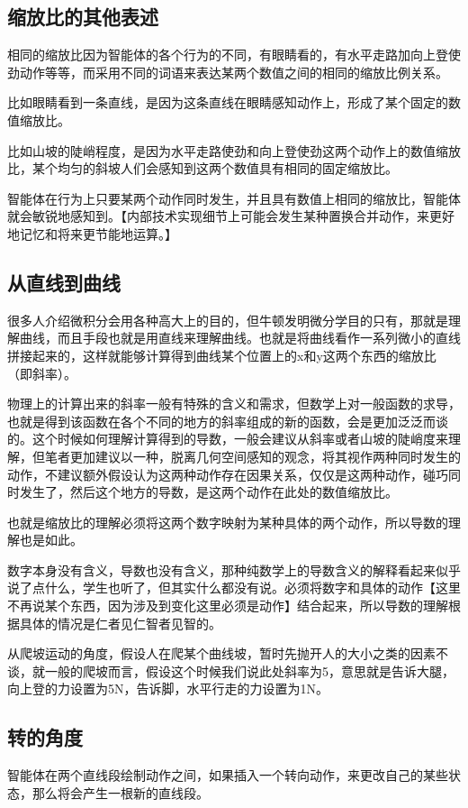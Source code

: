 \documentclass[12pt,oneside]{book}
\begin{document}
\subsection{缩放比的其他表述}
相同的缩放比因为智能体的各个行为的不同，有眼睛看的，有水平走路加向上登使劲动作等等，而采用不同的词语来表达某两个数值之间的相同的缩放比例关系。

比如眼睛看到一条直线，是因为这条直线在眼睛感知动作上，形成了某个固定的数值缩放比。

比如山坡的陡峭程度，是因为水平走路使劲和向上登使劲这两个动作上的数值缩放比，某个均匀的斜坡人们会感知到这两个数值具有相同的固定缩放比。

智能体在行为上只要某两个动作同时发生，并且具有数值上相同的缩放比，智能体就会敏锐地感知到。【内部技术实现细节上可能会发生某种置换合并动作，来更好地记忆和将来更节能地运算。】


\subsection{从直线到曲线}
很多人介绍微积分会用各种高大上的目的，但牛顿发明微分学目的只有，那就是理解曲线，而且手段也就是用直线来理解曲线。也就是将曲线看作一系列微小的直线拼接起来的，这样就能够计算得到曲线某个位置上的x和y这两个东西的缩放比（即斜率）。

物理上的计算出来的斜率一般有特殊的含义和需求，但数学上对一般函数的求导，也就是得到该函数在各个不同的地方的斜率组成的新的函数，会是更加泛泛而谈的。这个时候如何理解计算得到的导数，一般会建议从斜率或者山坡的陡峭度来理解，但笔者更加建议以一种，脱离几何空间感知的观念，将其视作两种同时发生的动作，不建议额外假设认为这两种动作存在因果关系，仅仅是这两种动作，碰巧同时发生了，然后这个地方的导数，是这两个动作在此处的数值缩放比。

也就是缩放比的理解必须将这两个数字映射为某种具体的两个动作，所以导数的理解也是如此。

数字本身没有含义，导数也没有含义，那种纯数学上的导数含义的解释看起来似乎说了点什么，学生也听了，但其实什么都没有说。必须将数字和具体的动作【这里不再说某个东西，因为涉及到变化这里必须是动作】结合起来，所以导数的理解根据具体的情况是仁者见仁智者见智的。

从爬坡运动的角度，假设人在爬某个曲线坡，暂时先抛开人的大小之类的因素不谈，就一般的爬坡而言，假设这个时候我们说此处斜率为5，意思就是告诉大腿，向上登的力设置为5N，告诉脚，水平行走的力设置为1N。



\subsection{转的角度}
智能体在两个直线段绘制动作之间，如果插入一个转向动作，来更改自己的某些状态，那么将会产生一根新的直线段。
\end{document}
